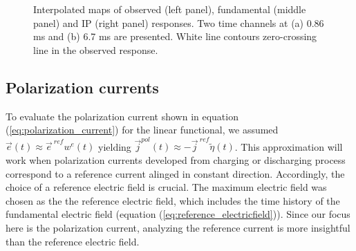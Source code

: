 \documentclass[extra,mreferee]{gji}
\renewcommand {\j}  { {\vec j} }
\newcommand {\e}  { {\vec e} }
\newcommand{\peta}{\tilde{\eta}}
\newcommand{\eref}{\e^{\ ref}}
\begin{document}
\begin{figure}
  \caption{Interpolated maps of observed (left panel), fundamental (middle panel) and IP (right panel) responses. Two time channels at (a) 0.86 ms and (b) 6.7 ms are presented. White line contours zero-crossing line in the observed response.  
  }
  \label{F:IPresp_Plan}
\end{figure}
\clearpage

\subsection{Polarization currents}
To evaluate the polarization current shown in equation (\ref{eq:polarization_current}) for the linear functional, we assumed $\e(t) \approx \eref w^e(t)$ yielding $\j^{pol}(t) \approx -\j^{\ ref} \peta(t)$. This approximation will work when polarization currents developed from charging or discharging process correspond to a reference current alinged in constant direction. Accordingly, the choice of a reference electric field is crucial. The maximum electric field was chosen as the the reference electric field, which includes the time history of the fundamental electric field (equation (\ref{eq:reference_electricfield})). Since our focus here is the polarization current, analyzing the reference current is more insightful than the reference electric field. 
\end{document}
